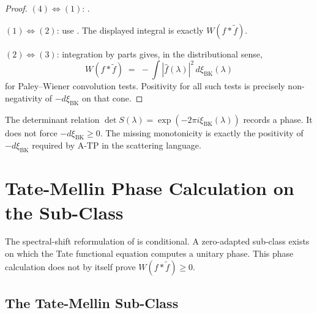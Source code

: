 \begin{proof}
\((4)\Leftrightarrow(1)\): .

\((1)\Leftrightarrow(2)\): use
. The displayed integral is
exactly \(W(f*\widetilde f)\).

\((2)\Leftrightarrow(3)\): integration by parts gives, in the
distributional sense,
\[
W(f*\widetilde{f})\;=\;-\int|\widehat{f}(\lambda)|^{2}\,d\xi_{\mathrm{BK}}(\lambda)
\]
for Paley--Wiener convolution tests. Positivity for all such tests is
precisely non-negativity of \(-d\xi_{\mathrm{BK}}\) on that cone.
\end{proof}

\begin{remark}
\label{v4-arith:w7-j:rem:honest-caveat}
The determinant relation \(\det S(\lambda)=\exp(-2\pi
i\xi_{\mathrm{BK}}(\lambda))\) records a phase. It does not force
\(-d\xi_{\mathrm{BK}}\ge0\). The missing monotonicity is exactly the
positivity of \(-d\xi_{\mathrm{BK}}\) required by A-TP in the scattering
language.
\end{remark}

\section{Tate-Mellin Phase Calculation on the Sub-Class}
\label{v4-arith:w7-j:tate-mellin-closure}

The spectral-shift reformulation of
 is conditional. A
zero-adapted sub-class exists on which the Tate functional equation
computes a unitary phase. This phase calculation does not by itself
prove \(W(f*\widetilde f)\ge0\).

\subsection{The Tate-Mellin Sub-Class}
\label{v4-arith:w7-j:sub-class}

